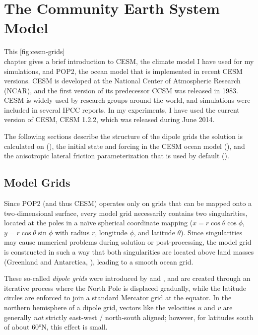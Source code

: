 \chapter{The Community Earth System Model}
This%
[fig:cesm-grids]%
{\\%
 }%
chapter gives a brief introduction to \ac{CESM}, the climate model I have used for my simulations, and \ac{POP2}, the ocean model that is implemented in recent \ac{CESM} versions. \ac{CESM} is developed at the National Center of Atmospheric Research (NCAR), and the first version of its predecessor CCSM was released in 1983. \ac{CESM} is widely used by research groups around the world, and simulations were \eg included in several IPCC reports. In my experiments, I have used the current version of \ac{CESM}, \ac{CESM} 1.2.2, which was released during June 2014.

The following sections describe the structure of the dipole grids the solution is calculated on (), the initial state and forcing in the \ac{CESM} ocean model (), and the anisotropic lateral friction parameterization that is used by default ().

\section{Model Grids}
\label{sec:cesm-grid}
Since \ac{POP2} (and thus \ac{CESM}) operates only on grids that can be mapped onto a two-dimensional surface, every model grid necessarily contains two singularities, located at the poles in a na\"ive spherical coordinate mapping (\ie \(x = r \cos \theta \cos \phi\), \(y = r \cos\theta \sin\phi\) with radius \(r\), longitude \(\phi\), and latitude \(\theta\)). Since singularities may cause numerical problems during solution or post-processing, the model grid is constructed in such a way that both singularities are located above land masses (Greenland and Antarctica, \cf {}), leading to a smooth ocean grid.

These so-called \emph{dipole grids} were introduced by \citet{madec} and \citet{smith}, and are created through an iterative process where the North Pole is displaced gradually, while the latitude circles are enforced to join a standard Mercator grid at the equator. In the northern hemisphere of a dipole grid, vectors like the velocities \(u\) and \(v\) are generally \emph{not} strictly east-west / north-south aligned; however, for latitudes south of about \ang{60}N, this effect is small.

